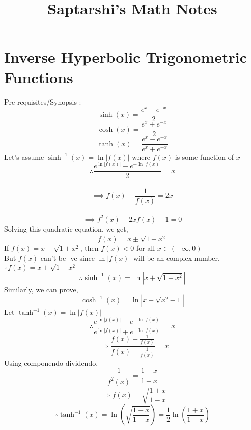 \documentclass[14pt]{article}
\begin{document}
	\title{Saptarshi's Math Notes}
	\maketitle
	\section{Inverse Hyperbolic Trigonometric Functions}
	\large{Pre-requisites/Synopsis :-}
	\begin{equation}
		\sinh(x)=\frac{e^x-e^{-x}}{2}
	\end{equation}
	\begin{equation}
		\cosh(x)=\frac{e^x+e^{-x}}{2}
	\end{equation}
	\begin{equation}
		\tanh(x)=\frac{e^x-e^{-x}}{e^x+e^{-x}}
	\end{equation}
	Let's assume $\sinh^{-1}(x)=\ln|f(x)|$ where $f(x)$ is some function of $x$ 
	\\ \begin{equation*}
	\therefore \frac{e^{\ln|f(x)|}-e^{-\ln|f(x)|}}{2} = x	
	\end{equation*}
	\\ \begin{equation*}
	\implies f(x)-\frac{1}{f(x)} = 2x		
	\end{equation*}
	\\ \begin{equation*}
	\implies f^2(x)-2xf(x)-1 = 0		
	\end{equation*}
	Solving this quadratic equation, we get,
	\begin{equation*}
		f(x)=x\pm\sqrt{1+x^2}
	\end{equation*}
	If $f(x)=x-\sqrt{1+x^2}$, then $f(x)<0$ for all $x\in(-\infty,0)$
	\\ But $f(x)$ can't be -ve since $\ln|f(x)|$ will be an complex number.
	$\therefore f(x)=x+\sqrt{1+x^2}$
	\begin{equation}
		\therefore \boxed{\sinh^{-1}(x)=\ln|x+\sqrt{1+x^2}|}
	\end{equation}
	Similarly, we can prove,
	\begin{equation}
	\boxed{\cosh^{-1}(x)=\ln|x+\sqrt{x^2-1}|}
	\end{equation}
	Let $\tanh^{-1}(x)=\ln|f(x)|$
	\begin{equation*}
		\therefore \frac{e^{\ln|f(x)|}-e^{-\ln|f(x)|}}{e^{\ln|f(x)|}+e^{-\ln|f(x)|}}=x
	\end{equation*}
	\begin{equation*}
	\implies \frac{f(x)-\frac{1}{f(x)}}{f(x)+\frac{1}{f(x)}}=x
	\end{equation*}
	Using componendo-dividendo,
	\begin{equation*}
	\frac{1}{f^2(x)}=\frac{1-x}{1+x}
	\end{equation*}
	\begin{equation*}
	\implies f(x)=\sqrt{\frac{1+x}{1-x}}
	\end{equation*}
	\begin{equation}
	\therefore \boxed{\tanh^{-1}(x)=\ln(\sqrt{\frac{1+x}{1-x}})=\frac{1}{2}\ln(\frac{1+x}{1-x})}
	\end{equation}
\end{document}
